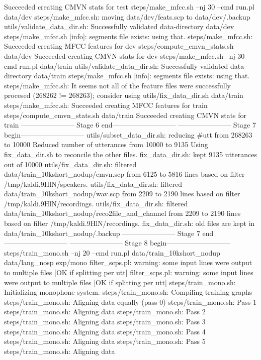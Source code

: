 Succeeded creating CMVN stats for test
steps/make_mfcc.sh --nj 30 --cmd run.pl data/dev
steps/make_mfcc.sh: moving data/dev/feats.scp to data/dev/.backup
utils/validate_data_dir.sh: Successfully validated data-directory data/dev
steps/make_mfcc.sh [info]: segments file exists: using that.
steps/make_mfcc.sh: Succeeded creating MFCC features for dev
steps/compute_cmvn_stats.sh data/dev
Succeeded creating CMVN stats for dev
steps/make_mfcc.sh --nj 30 --cmd run.pl data/train
utils/validate_data_dir.sh: Successfully validated data-directory data/train
steps/make_mfcc.sh [info]: segments file exists: using that.
steps/make_mfcc.sh: It seems not all of the feature files were successfully procesed (268262 != 268263); consider using utils/fix_data_dir.sh data/train
steps/make_mfcc.sh: Succeeded creating MFCC features for train
steps/compute_cmvn_stats.sh data/train
Succeeded creating CMVN stats for train
----------------------- Stage 6 end---------------------------
----------------------- Stage 7 begin---------------------------
utils/subset_data_dir.sh: reducing #utt from 268263 to 10000
Reduced number of utterances from 10000 to 9135
Using fix_data_dir.sh to reconcile the other files.
fix_data_dir.sh: kept 9135 utterances out of 10000
utils/fix_data_dir.sh: filtered data/train_10kshort_nodup/cmvn.scp from 6125 to 5816 lines based on filter /tmp/kaldi.9HlN/speakers.
utils/fix_data_dir.sh: filtered data/train_10kshort_nodup/wav.scp from 2209 to 2190 lines based on filter /tmp/kaldi.9HlN/recordings.
utils/fix_data_dir.sh: filtered data/train_10kshort_nodup/reco2file_and_channel from 2209 to 2190 lines based on filter /tmp/kaldi.9HlN/recordings.
fix_data_dir.sh: old files are kept in data/train_10kshort_nodup/.backup
----------------------- Stage 7 end---------------------------
----------------------- Stage 8 begin---------------------------
steps/train_mono.sh --nj 20 --cmd run.pl data/train_10kshort_nodup data/lang_nosp exp/mono
filter_scps.pl: warning: some input lines were output to multiple files [OK if splitting per utt] 
filter_scps.pl: warning: some input lines were output to multiple files [OK if splitting per utt] 
steps/train_mono.sh: Initializing monophone system.
steps/train_mono.sh: Compiling training graphs
steps/train_mono.sh: Aligning data equally (pass 0)
steps/train_mono.sh: Pass 1
steps/train_mono.sh: Aligning data
steps/train_mono.sh: Pass 2
steps/train_mono.sh: Aligning data
steps/train_mono.sh: Pass 3
steps/train_mono.sh: Aligning data
steps/train_mono.sh: Pass 4
steps/train_mono.sh: Aligning data
steps/train_mono.sh: Pass 5
steps/train_mono.sh: Aligning data

